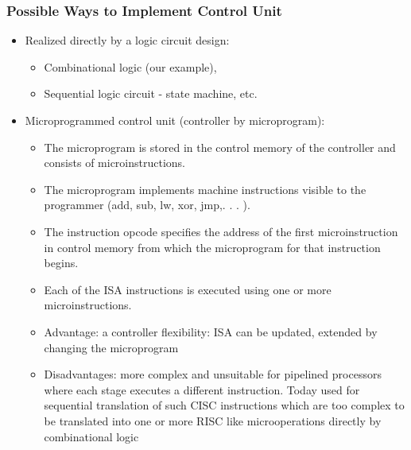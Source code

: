 \documentclass{beamer}
\begin{document}
\begin{frame}[shrink=5]
\frametitle{Possible Ways to Implement Control Unit}
\begin{itemize}
\item Realized directly by a logic circuit design:
\begin{itemize}
\item Combinational logic (our example),
\item Sequential logic circuit - state machine, etc.
\end{itemize}
\item Microprogrammed control unit (controller by microprogram):
\begin{itemize}
\item The microprogram is stored in the control memory of the controller and consists of microinstructions.
\item The microprogram implements machine instructions visible to the programmer (add, sub, lw, xor, jmp,. . . ).
\item The instruction opcode specifies the address of the first microinstruction in control memory from which the microprogram for that instruction begins.
\item Each of the ISA instructions is executed using one or more microinstructions.
\item Advantage: a controller flexibility: ISA can be updated, extended by changing the microprogram
\item Disadvantages: more complex and unsuitable for pipelined processors where each stage executes a different instruction. Today used for sequential translation of such CISC instructions which are too complex to be translated into one or more RISC like microoperations directly by combinational logic
\end{itemize}
\end{itemize}
\end{frame}
\end{document}
